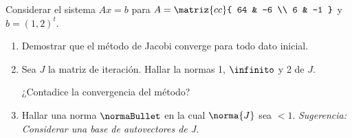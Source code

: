 \begin{enunciado}{\ejercicio}
  Considerar el sistema $Ax = b$ para
  $A = \matriz{cc}{
      64 & -6 \\
      6 & -1
    }$
  y $b = (1,2)^t$.
  \begin{enumerate}[label=\alph*)]
    \item Demostrar que el método de Jacobi converge para todo dato inicial.
    \item Sea $J$ la matriz de iteración. Hallar la normas 1, $\infinito$ y 2 de $J$.

          ¿Contadice la convergencia del método?

    \item Hallar una norma $\normaBullet$ en la cual $\norma{J}$ sea $< 1$.
          \textit{Sugerencia: Considerar una base de autovectores de J}.
  \end{enumerate}
\end{enunciado}

\hacer
